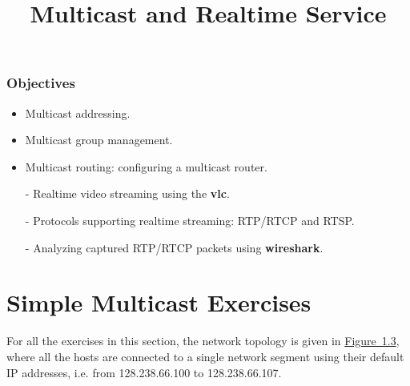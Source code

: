 \documentclass{../UTNetLab}
\title{Multicast and Realtime Service}
\begin{document}
\section*{Objectives}
\begin{itemize}
    \item Multicast addressing.
    \item Multicast group management.
    \item Multicast routing: configuring a multicast router.
    \item [-] Realtime video streaming using the \textbf{vlc}.
    \item [-] Protocols supporting realtime streaming: RTP/RTCP and RTSP.
    \item [-] Analyzing captured RTP/RTCP packets using \textbf{wireshark}.
\end{itemize}

\part{Simple Multicast Exercises}
For all the exercises in this section, the network topology is given in \hyperref[fig:1.3]{Figure~1.3}, where all the hosts are connected to a single network segment using their default IP addresses, i.e. from 128.238.66.100 to 128.238.66.107.
\end{document}
